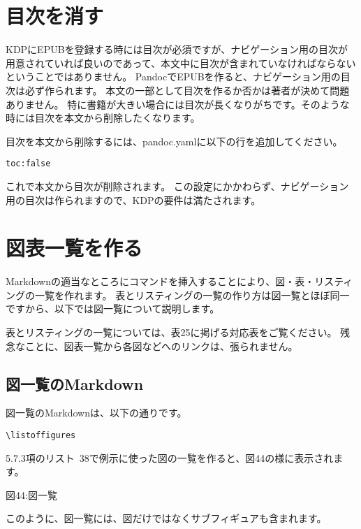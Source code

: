\section{目次を消す}\label{ux76eeux6b21ux3092ux6d88ux3059}

KDPにEPUBを登録する時には目次が必須ですが、ナビゲーション用の目次が用意されていれば良いのであって、本文中に目次が含まれていなければならないということではありません。
PandocでEPUBを作ると、ナビゲーション用の目次は必ず作られます。
本文の一部として目次を作るか否かは著者が決めて問題ありません。
特に書籍が大きい場合には目次が長くなりがちです。そのような時には目次を本文から削除したくなります。

目次を本文から削除するには、pandoc.yamlに以下の行を追加してください。

\begin{verbatim}
toc:false
\end{verbatim}

これで本文から目次が削除されます。
この設定にかかわらず、ナビゲーション用の目次は作られますので、KDPの要件は満たされます。

\section{図表一覧を作る}\label{ux56f3ux8868ux4e00ux89a7ux3092ux4f5cux308b}

Markdownの適当なところにコマンドを挿入することにより、図・表・リスティングの一覧を作れます。
表とリスティングの一覧の作り方は図一覧とほぼ同一ですから、以下では図一覧について説明します。

表とリスティングの一覧については、表25に掲げる対応表をご覧ください。
残念なことに、図表一覧から各図などへのリンクは、張られません。

\subsection{図一覧のMarkdown}\label{ux56f3ux4e00ux89a7ux306emarkdown}

図一覧のMarkdownは、以下の通りです。

\begin{verbatim}
\listoffigures
\end{verbatim}

5.7.3項のリスト~38で例示に使った図の一覧を作ると、図44の様に表示されます。

図44:図一覧

このように、図一覧には、図だけではなくサブフィギュアも含まれます。


